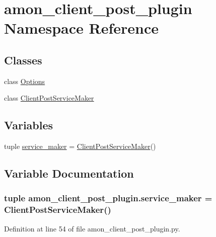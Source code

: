 \hypertarget{namespaceamon__client__post__plugin}{\section{amon\-\_\-client\-\_\-post\-\_\-plugin Namespace Reference}
\label{namespaceamon__client__post__plugin}
}
\subsection*{Classes}
\begin{DoxyCompactItemize}
\item 
class \hyperlink{classamon__client__post__plugin_1_1_options}{Options}
\item 
class \hyperlink{classamon__client__post__plugin_1_1_client_post_service_maker}{Client\-Post\-Service\-Maker}
\end{DoxyCompactItemize}
\subsection*{Variables}
\begin{DoxyCompactItemize}
\item 
tuple \hyperlink{namespaceamon__client__post__plugin_a0cbeccd8b547a19f07803197c58cfeb7}{service\-\_\-maker} = \hyperlink{classamon__client__post__plugin_1_1_client_post_service_maker}{Client\-Post\-Service\-Maker}()
\end{DoxyCompactItemize}


\subsection{Variable Documentation}
\hypertarget{namespaceamon__client__post__plugin_a0cbeccd8b547a19f07803197c58cfeb7}{
\subsubsection[{service\-\_\-maker}]{\setlength{\rightskip}{0pt plus 5cm}tuple amon\-\_\-client\-\_\-post\-\_\-plugin.\-service\-\_\-maker = {\bf Client\-Post\-Service\-Maker}()}}\label{namespaceamon__client__post__plugin_a0cbeccd8b547a19f07803197c58cfeb7}


Definition at line 54 of file amon\-\_\-client\-\_\-post\-\_\-plugin.\-py.

